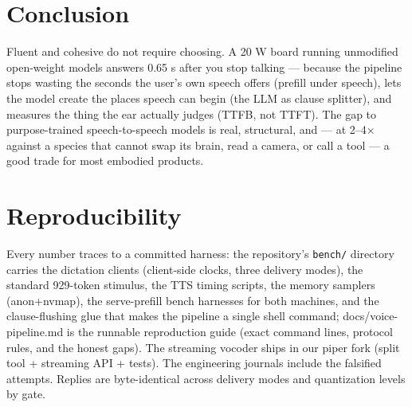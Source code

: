 \documentclass{article}
\begin{document}
\section{Conclusion}

Fluent and cohesive do not require choosing. A 20 W board running unmodified open-weight models answers 0.65 s after you stop talking — because the pipeline stops wasting the seconds the user's own speech offers (prefill under speech), lets the model create the places speech can begin (the LLM as clause splitter), and measures the thing the ear actually judges (TTFB, not TTFT). The gap to purpose-trained speech-to-speech models is real, structural, and — at 2–4× against a species that cannot swap its brain, read a camera, or call a tool — a good trade for most embodied products.

\appendix

\section{Reproducibility}

Every number traces to a committed harness: the repository's \verb|bench/| directory carries the dictation clients (client-side clocks, three delivery modes), the standard 929-token stimulus, the TTS timing scripts, the memory samplers (anon+nvmap), the serve-prefill bench harnesses for both machines, and the clause-flushing glue that makes the pipeline a single shell command; docs/voice-pipeline.md is the runnable reproduction guide (exact command lines, protocol rules, and the honest gaps). The streaming vocoder ships in our piper fork (split tool + streaming API + tests). The engineering journals include the falsified attempts. Replies are byte-identical across delivery modes and quantization levels by gate.
\end{document}

